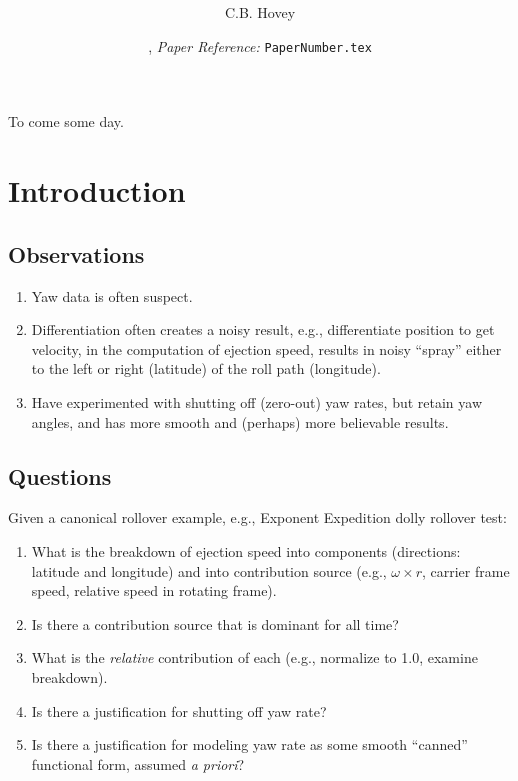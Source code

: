 \documentclass[10pt,twocolumn,reqno]{amsart}
\title{\bfseries \cbhTitle}
\author{C.B. Hovey}
\date{\cbhPublishDate,  {\em Paper Reference:} {\tt PaperNumber.tex}}
\begin{document}
{\abstract
To come some day.
}

\maketitle


\section{Introduction}
\subsection{Observations}
\begin{enumerate}
 \item Yaw data is often suspect.
 \item Differentiation often creates a noisy result, e.g., differentiate position to get velocity, in the 
 computation of ejection speed, results in noisy ``spray'' either to the left or right (latitude) of the
 roll path (longitude).
 \item Have experimented with shutting off (zero-out) yaw rates, but retain yaw angles, and has 
 more smooth and (perhaps) more believable results.
\end{enumerate}


\subsection{Questions}
Given a canonical rollover example, e.g., Exponent Expedition dolly rollover test:
\begin{enumerate}
 \item What is the breakdown of ejection speed into components (directions: latitude and longitude) and
 into contribution source (e.g., $\omega \times r$, carrier frame speed, relative speed in rotating frame).
 \item Is there a contribution source that is dominant for all time?
 \item What is the {\em relative} contribution of each (e.g., normalize to 1.0, examine breakdown).
 \item Is there a justification for shutting off yaw rate?
 \item Is there a justification for modeling yaw rate as some smooth ``canned'' functional form, assumed 
 {\em a priori}?
\end{enumerate}
\end{document}
